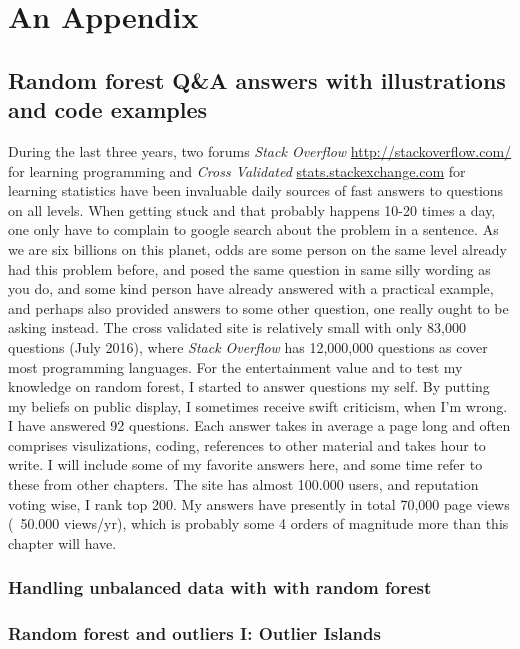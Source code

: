 \chapter{An Appendix}


\section{Random forest Q&A answers with illustrations and code examples}

During the last three years, two forums \textit{Stack Overflow} \url{http://stackoverflow.com/} for learning programming and \textit{Cross Validated} \url{stats.stackexchange.com} for learning statistics have been invaluable daily sources of fast answers to questions on all levels. When getting stuck and that probably happens 10-20 times a day, one only have to complain to google search about the problem in a sentence. As we are six billions on this planet, odds are some person on the same level already had this problem before, and posed the same question in same silly wording as you do, and some kind person have already answered with a practical example, and perhaps also provided answers to some other question, one really ought to be asking instead. The cross validated site is relatively small with only 83,000 questions (July 2016), where \textit{Stack Overflow} has 12,000,000 questions as cover most programming languages. For the entertainment value and to test my knowledge on random forest, I started to answer questions my self. By putting my beliefs on public display, I sometimes receive swift criticism, when I'm wrong. I have answered 92 questions. Each answer takes in average  a page long and often comprises visulizations, coding, references to other material and takes hour to write. I will include some of my favorite answers here, and some time refer to these from other chapters. The site has almost 100.000 users, and reputation voting wise, I rank top 200. My answers have presently in total 70,000 page views (~50.000 views/yr), which is probably some 4 orders of magnitude more than this chapter will have.


\subsection{Handling unbalanced data with with random forest}



\subsection{Random forest and outliers I: Outlier Islands}



